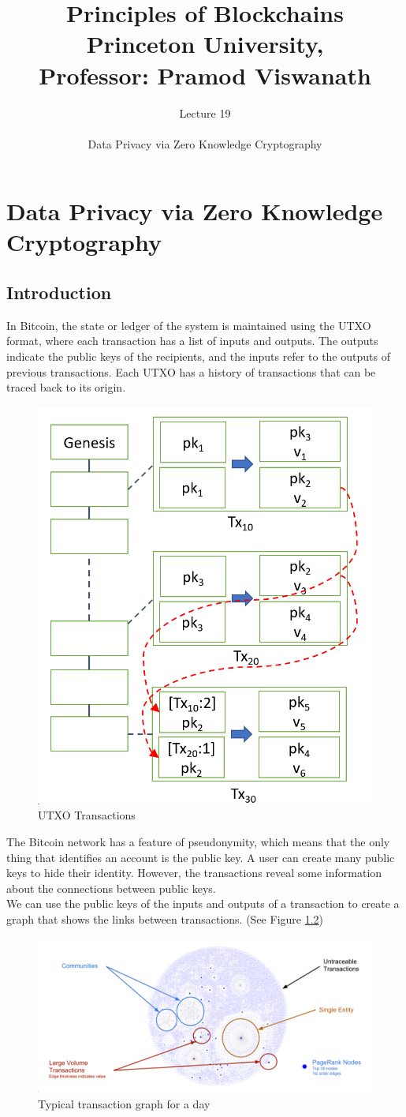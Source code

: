 \documentclass{report}
\title{\Huge{Principles of Blockchains \\ Princeton University,\\
		Professor: Pramod Viswanath}}
\author{\huge{Lecture 19} \\\\ Data Privacy via Zero Knowledge Cryptography}
\begin{document}
\maketitle
\newpage%
\tableofcontents
\pagebreak

\chapter{Data Privacy via Zero Knowledge Cryptography}
\section{Introduction}
In Bitcoin, the state or ledger of the system is maintained using the UTXO format, where each transaction has a list of inputs and outputs. The outputs indicate the public keys of the recipients, and the inputs refer to the outputs of previous transactions. Each UTXO has a history of transactions that can be traced back to its origin.
\begin{figure}[h!]
	\centering
	\includegraphics[width=0.25\linewidth]{Fig/F1}
	\caption{UTXO Transactions}
	\label{fig:f1}
\end{figure}
The Bitcoin network has a feature of pseudonymity, which means that the only thing that identifies an account is the public key. A user can create many public keys to hide their identity. However, the transactions reveal some information about the connections between public keys.\\
 We can use the public keys of the inputs and outputs of a transaction to create a graph that shows the links between transactions. (See Figure \ref{fig:f2})
\begin{figure}[h!]
	\centering
	\includegraphics[width=0.8\linewidth]{Fig/F2}
	\caption{Typical transaction graph for a day}
	\label{fig:f2}
\end{figure}
\end{document}
